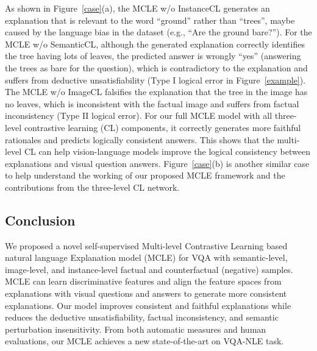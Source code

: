 \documentclass[letterpaper]{article} %
\begin{document}
As shown in Figure~\ref{case}(a), the MCLE w/o InstanceCL generates an explanation that is relevant to the word ``ground'' rather than ``trees'', maybe caused by the language bias in the dataset (e.g., ``Are the ground bare?''). For the MCLE w/o SemanticCL, although the generated explanation correctly identifies the tree having lots of leaves, the predicted answer is wrongly ``yes'' (answering the trees as bare for the question), which is contradictory to the explanation and suffers from deductive unsatisfiability (Type I logical error in Figure~\ref{example}). The MCLE w/o ImageCL falsifies the explanation that the tree in the image has no leaves, which is inconsistent with the factual image and suffers from factual inconsistency  (Type II logical error). For our full MCLE model with all three-level contrastive learning (CL) components, it correctly generates more faithful rationales and predicts logically consistent answers. This shows that the multi-level CL can help vision-language models improve the logical consistency between explanations and visual question answers. Figure~\ref{case}(b) is another similar case to help understand the working of our proposed MCLE framework and the contributions from the three-level CL network.



\subsection{Conclusion}
We proposed a novel self-supervised {M}ulti-level {C}ontrastive {L}earning based natural language {E}xplanation model (MCLE) for VQA with semantic-level, image-level, and instance-level factual and counterfactual (negative) samples. MCLE can learn discriminative features and align the feature spaces from explanations with visual questions and answers to generate more consistent explanations. Our model improves consistent and faithful explanations while reduces the deductive unsatisfiability, factual inconsistency, and semantic perturbation insensitivity. From both automatic measures and human evaluations, our MCLE achieves a new state-of-the-art on VQA-NLE task.
\end{document}

